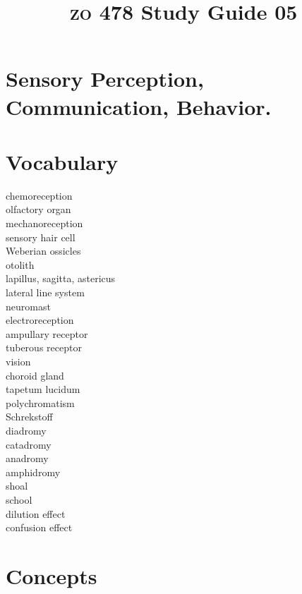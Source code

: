 \documentclass[letterpaper]{tufte-handout}
\title{{\scshape zo} 478 Study Guide 05}
\date{} %
\begin{document}
\maketitle	%

\section*{Sensory Perception, Communication, Behavior.}

\section{Vocabulary} 
\vspace{-1\baselineskip}
\begin{multicols}{2}
chemoreception \\
olfactory organ \\
mechanoreception \\
sensory hair cell \\
Weberian ossicles \\
otolith \\
lapillus, sagitta, astericus \\
lateral line system \\
neuromast \\
electroreception \\
ampullary receptor \\
tuberous receptor \\
vision \\
choroid gland \\
tapetum lucidum \\
polychromatism \\
Schrekstoff \\
diadromy \\
catadromy \\
anadromy \\
amphidromy \\
shoal \\
school \\
dilution effect \\
confusion effect 
\end{multicols}

\section{Concepts}
\end{document}
